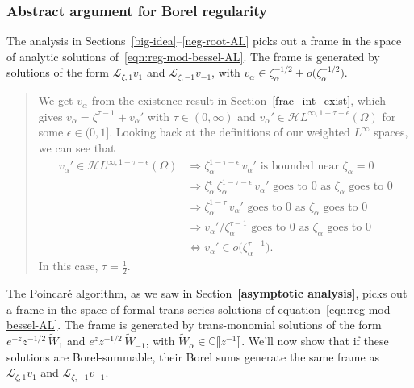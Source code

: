 \documentclass{article}
\theoremstyle{definition}
\newcommand{\C}{\mathbb{C}}
\newcommand{\holoL}[1]{\mathcal{H}L^{#1}} %
\newcommand{\laplace}{\mathcal{L}}
\begin{document}
\subsubsection{Abstract argument for Borel regularity}\label{bessel-regularity-AL}
The analysis in Sections~\ref{big-idea}--\ref{neg-root-AL} picks out a frame in the space of analytic solutions of~\eqref{eqn:reg-mod-bessel-AL}. The frame is generated by solutions of the form $\laplace_{\zeta, 1} v_1$ and $\laplace_{\zeta, -1} v_{-1}$, with $v_\alpha \in \zeta_\alpha^{-1/2} + o\big(\zeta_\alpha^{-1/2}\big)$.
\color{DarkTurquoise}
\begin{quote}
We get $v_\alpha$ from the existence result in Section~\ref{frac_int_exist}, which gives $v_\alpha = \zeta^{\tau-1} + v_\alpha'$ with $\tau \in (0, \infty)$ and $v_\alpha' \in \holoL{\infty, 1-\tau-\epsilon}(\Omega)$ for some $\epsilon \in (0, 1]$. Looking back at the definitions of our weighted $L^\infty$ spaces, we can see that
\begin{align*}
v_\alpha' \in \holoL{\infty, 1-\tau-\epsilon}(\Omega) & \Longrightarrow \zeta_\alpha^{1-\tau-\epsilon}\,v_\alpha' \text{ is bounded near } \zeta_\alpha = 0 \\
& \Longrightarrow \zeta_\alpha^\epsilon\,\zeta_\alpha^{1-\tau-\epsilon}\,v_\alpha' \text{ goes to } 0 \text{ as } \zeta_\alpha \text{ goes to } 0 \\
& \Longrightarrow \zeta_\alpha^{1-\tau}\,v_\alpha' \text{ goes to } 0 \text{ as } \zeta_\alpha \text{ goes to } 0 \\
& \Longrightarrow v_\alpha' / \zeta_\alpha^{\tau-1} \text{ goes to } 0 \text{ as } \zeta_\alpha \text{ goes to } 0 \\
& \Longleftrightarrow v_\alpha' \in o\big(\zeta_\alpha^{\tau-1}\big).
\end{align*}
In this case, $\tau = \tfrac{1}{2}$.
\end{quote}
\color{black}

The Poincar\'{e} algorithm, as we saw in Section~\textbf{[asymptotic analysis]}, picks out a frame in the space of formal trans-series solutions of equation~\eqref{eqn:reg-mod-bessel-AL}. The frame is generated by trans-monomial solutions of the form $e^{-z} z^{-1/2}\,\tilde{W}_1$ and $e^z z^{-1/2}\,\tilde{W}_{-1}$, with $\tilde{W}_\alpha \in \C\llbracket z^{-1} \rrbracket$. We'll now show that if these solutions are Borel-summable, their Borel sums generate the same frame as $\laplace_{\zeta, 1} v_1$ and $\laplace_{\zeta, -1} v_{-1}$.
\end{document}
